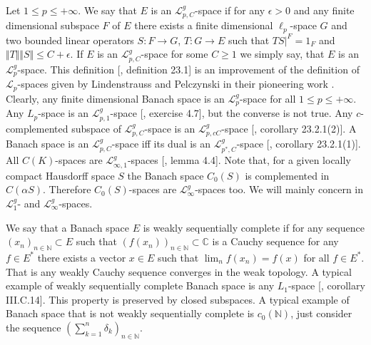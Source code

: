 Let $1\leq p\leq +\infty$. We say that $E$ is an $\mathscr{L}_{p,C}^g$-space if for any $\epsilon>0$ and any finite dimensional subspace $F$ of $E$ there exists a finite dimensional $\ell_p$-space $G$ and two bounded linear operators $S:F\to G$, $T:G\to E$ such that $TS|^F=1_F$ and $\Vert T\Vert\Vert S\Vert\leq C+\epsilon$. If $E$ is an $\mathscr{L}_{p,C}^g$-space for some $C\geq 1$ we simply say, that $E$ is an $\mathscr{L}_p^g$-space. This definition [\cite{DefFloTensNorOpId}, definition 23.1] is an improvement of the definition of $\mathscr{L}_p$-spaces given by Lindenstrauss and Pelczynski in their pioneering work \cite{LinPelAbsSumOpInLpSpAndApp}. Clearly, any finite dimensional Banach space is an $\mathscr{L}_p^g$-space for all $1\leq p\leq +\infty$. Any $L_p$-space is an $\mathscr{L}_{p,1}^g$-space  [\cite{DefFloTensNorOpId}, exercise 4.7], but the converse is not true. Any $c$-complemented subspace of $\mathscr{L}_{p,C}^g$-space is an $\mathscr{L}_{p,cC}^g$-space [\cite{DefFloTensNorOpId}, corollary 23.2.1(2)]. A Banach space is an $\mathscr{L}_{p,C}^g$-space iff its dual is an $\mathscr{L}_{p^*,C}^g$-space [\cite{DefFloTensNorOpId}, corollary 23.2.1(1)]. All $C(K)$-spaces are $\mathscr{L}_{\infty, 1}^g$-spaces [\cite{DefFloTensNorOpId}, lemma 4.4]. Note that, for a given locally compact Hausdorff space $S$ the Banach space $C_0(S)$ is complemented in $C(\alpha S)$. Therefore $C_0(S)$-spaces are $\mathscr{L}_\infty^g$-spaces too. We will mainly concern in $\mathscr{L}_1^g$- and $\mathscr{L}_\infty^g$-spaces.

We say that a Banach space $E$ is weakly sequentially complete if for any sequence $(x_n)_{n\in\mathbb{N}}\subset E$ such that $(f(x_n))_{n\in\mathbb{N}}\subset\mathbb{C}$ is a Cauchy sequence for any $f\in E^*$ there exists a vector $x\in E$ such that $\lim_n f(x_n)=f(x)$ for all $f\in E^*$. That is any weakly Cauchy sequence converges in the weak topology. A typical example of weakly sequentially complete Banach space is any $L_1$-space [\cite{WojBanSpForAnalysts}, corollary III.C.14]. This property is preserved by closed subspaces. A typical example of Banach space that is not weakly sequentially complete is $c_0(\mathbb{N})$, just consider the sequence $(\sum_{k=1}^n \delta_k)_{n\in\mathbb{N}}$.

